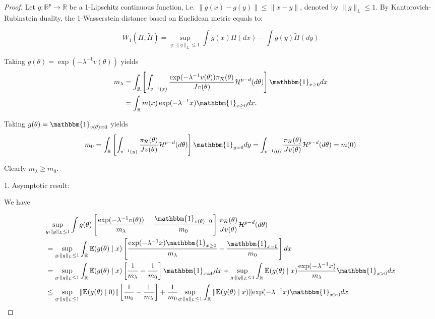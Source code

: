 \documentclass[10pt,fleqn]{article}
\newcommand{\mc}[1]{\mathcal{#1}}
\DeclareMathOperator{\1}{\mathbbm{1}}
\begin{document}
\begin{proof}[Proof]
Let $g:\mathbb{R}^p\rightarrow \mathbb{R}$ be a 1-Lipschitz continuous function, i.e. $\|g(x)-g(y)\|\le \|x-y\|$, denoted by $\|g\|_L\le 1$. 
By Kantorovich-Rubinstein duality, the 1-Wasserstein distance based on Euclidean metric equals to: 

\begin{equation}
W_1(\Pi,\tilde\Pi)=\underset{g:\|g\|_L\le 1}\sup \int g(x) \Pi(dx) -  \int g(y) \tilde\Pi(dy) 
\end{equation}

Taking $g(\theta)=\exp(-\lambda^{-1}v(\theta))$ yields
\begin{equation}
\begin{aligned}
m_\lambda
& = \int_\mathbb{R}  \left[ \int_{v^{-1}(x)} \frac{ \exp(- \lambda^{-1} v(\theta) ) \pi_{\mc R}(\theta)}{ J v(\theta) } \mathcal{H}^{p-d}(d \theta) \right] \mathbbm{1}_{x \ge 0}  d x \\
& = \int_\mathbb{R}  m(x)\exp(- \lambda^{-1} x ) \mathbbm{1}_{x \ge 0}  d x .
\end{aligned}
\end{equation}

Taking $g(\theta)={\mathbbm{1}_{v(\theta)=0}}$ yields 
\begin{equation}
m_0
= \int_\mathbb{R} \left[ \int_{v^{-1}(y)} \frac{ \pi_{\mc R}(\theta) }{ J v(\theta) } \mathcal{H}^{p-d}(d \theta) \right]\mathbbm{1}_{y=0} dy   =  \int_{v^{-1}(0)} \frac{ \pi_{\mc R}(\theta) }{ J v(\theta) } \mathcal{H}^{p-d}(d \theta) =m(0)
\end{equation}


Clearly $m_\lambda \ge m_0$.

1. Asymptotic result:

We have

\begin{equation}                
\label{wass0}
\begin{aligned}
&\underset{g:\|g\|_L\le 1}\sup\int g(\theta)  \left[ \frac{ \exp(- \lambda^{-1} v(\theta)) } {  m_\lambda}  - 
\frac{ \mathbbm{1}_{v(\theta)=0} } {  m_0} 
\right]  \frac{\pi_{\mc R}(\theta)}{Jv(\theta)} \mc H^{p-d}(d \theta) \\
&= \underset{g:\|g\|_L\le 1}\sup\int_\mathbb{R}  \mathbb{E}(g(\theta) \mid x)  \left[ \frac{ \exp(- \lambda^{-1} x) \mathbbm{1}_{x \ge 0}} {  m_\lambda}  - 
\frac{ \mathbbm{1}_{x=0} } {  m_0} 
\right] d x \\
&=      \underset{g:\|g\|_L\le 1}\sup\int_\mathbb{R}  \mathbb{E}(g(\theta) \mid x)  \left[ \frac{  1} {  m_\lambda}  - 
\frac{ 1 } {  m_0} 
\right]\mathbbm{1}_{x=0} d x  + \underset{g:\|g\|_L\le 1}\sup\int_\mathbb{R}  \mathbb{E}(g(\theta) \mid x)\frac{ \exp(- \lambda^{-1} x)} {  m_\lambda}  
\mathbbm{1}_{x > 0} d x \\
& \le \underset{g:\|g\|_L\le 1}\sup \|\mathbb{E}(g(\theta) \mid 0)\| \left[ \frac{ 1 } {  m_0} -\frac{  1} {  m_\lambda}   
\right] + \frac{1} {  m_0} \underset{g:\|g\|_L\le 1}\sup \int_\mathbb{R}  \|\mathbb{E}(g(\theta) \mid x)\| { \exp(- \lambda^{-1} x)}
\mathbbm{1}_{x > 0} d x \\      
\end{aligned}
\end{equation}



\end{proof}
\end{document}
